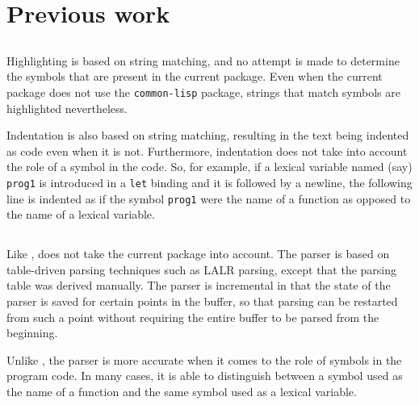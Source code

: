 \section{Previous work}

\subsection{\emacs{}}

Highlighting is based on string matching, and no attempt is made to
determine the symbols that are present in the current package.
Even when the current package does not use the \texttt{common-lisp}
package, strings that match \commonlisp{} symbols are highlighted
nevertheless.

Indentation is also based on string matching, resulting in the text
being indented as \commonlisp{} code even when it is not.
Furthermore, indentation does not take into account the role of a
symbol in the code.  So, for example, if a lexical variable named
(say) \texttt{prog1} is introduced in a \texttt{let} binding and
it is followed by a newline, the following line is indented as if the
symbol \texttt{prog1} were the name of a \commonlisp{} function as
opposed to the name of a lexical variable.

\subsection{\climacs{}}

Like \emacs{}, \climacs{} does not take the current package into
account.  The parser is based on table-driven parsing techniques
such as LALR parsing, except that the parsing table was derived
manually.  The parser is incremental in that the state of the parser
is saved for certain points in the buffer, so that parsing can be
restarted from such a point without requiring the entire buffer to be
parsed from the beginning.

Unlike \emacs{}, the \climacs{} parser is more accurate when it comes
to the role of symbols in the program code.  In many cases, it is able
to distinguish between a symbol used as the name of a function and the
same symbol used as a lexical variable.
